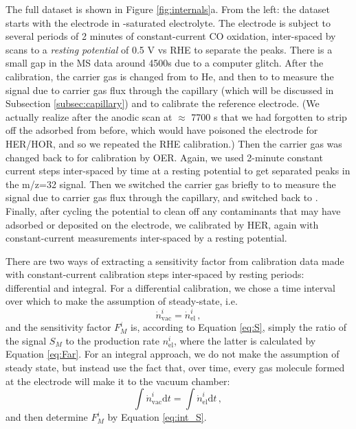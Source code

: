 The full dataset is shown in Figure \ref{fig:internals}a. From the left: the dataset starts with the electrode in -saturated electrolyte. The electrode is subject to several periods of 2 minutes of constant-current CO oxidation, inter-spaced by scans to a \textit{resting potential} of 0.5 V vs RHE to separate the peaks. There is a small gap in the MS data around 4500s due to a computer glitch. After the  calibration, the carrier gas is changed from  to He, and then to  to measure the signal due to  carrier gas flux through the capillary (which will be discussed in Subsection \ref{subsec:capillary}) and to calibrate the reference electrode. (We actually realize after the anodic scan at $\approx$ 7700 s that we had forgotten to strip off the adsorbed  from before, which would have poisoned the electrode for HER/HOR, and so we repeated the RHE calibration.) Then the carrier gas was changed back to  for  calibration by OER. Again, we used 2-minute constant current steps inter-spaced by time at a resting potential to get separated peaks in the m/z=32 signal. Then we switched the carrier gas briefly to  to measure the signal due to  carrier gas flux through the capillary, and switched back to . Finally, after cycling the potential to clean off any contaminants that may have adsorbed or deposited on the electrode, we calibrated  by HER, again with constant-current measurements inter-spaced by a resting potential.

There are two ways of extracting a sensitivity factor from calibration data made with constant-current calibration steps inter-spaced by resting periods: differential and integral. For a differential calibration, we chose a time interval over which to make the assumption of steady-state, i.e. 
\begin{equation}
\dot{n}^i_\text{vac} = \dot{n}^i_\text{el}\,,\label{eq:SS}
\end{equation}
and the sensitivity factor $F_M^i$ is, according to Equation \ref{eq:S}, simply the ratio of the signal $S_M$ to the production rate $n^i_\text{el}$, where the latter is calculated by Equation \ref{eq:Far}. For an integral approach, we do not make the assumption of steady state, but instead use the fact that, over time, every gas molecule formed at the electrode will make it to the vacuum chamber:
\begin{equation}
\int \dot{n}^i_\text{vac}\mathrm{d}t = \int \dot{n}^i_\text{el}\mathrm{d}t\,,\label{eq:int}\,
\end{equation}
and then determine $F_M^i$ by Equation \ref{eq:int_S}.

